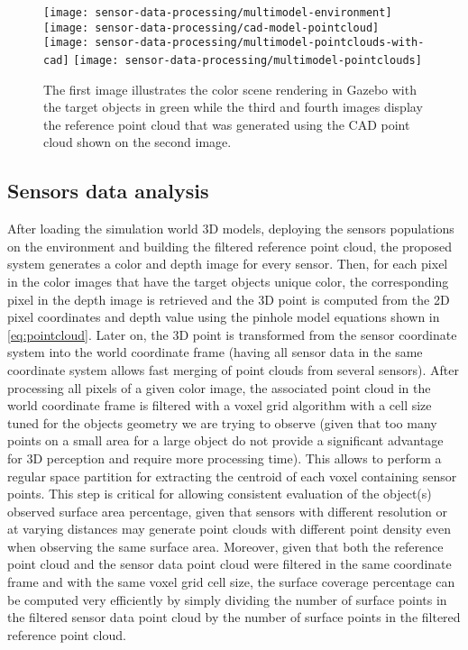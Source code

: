 \begin{figure}
	\centering
	\texttt{[image: sensor-data-processing/multimodel-environment]}\hspace{2em}
	\texttt{[image: sensor-data-processing/cad-model-pointcloud]}
	\texttt{[image: sensor-data-processing/multimodel-pointclouds-with-cad]}\hspace{2em}
	\texttt{[image: sensor-data-processing/multimodel-pointclouds]}
	\caption{The first image illustrates the color scene rendering in Gazebo with the target objects in green while the third and fourth images display the reference point cloud that was generated using the CAD point cloud shown on the second image.}
	\label{fig:reference-cloud}
\end{figure}


\subsection{Sensors data analysis}

After loading the simulation world 3D models, deploying the sensors populations on the environment and building the filtered reference point cloud, the proposed system generates a color and depth image for every sensor. Then, for each pixel in the color images that have the target objects unique color, the corresponding pixel in the depth image is retrieved and the 3D point is computed from the 2D pixel coordinates and depth value using the pinhole model equations shown in \cref{eq:pointcloud}. Later on, the 3D point is transformed from the sensor coordinate system into the world coordinate frame (having all sensor data in the same coordinate system allows fast merging of point clouds from several sensors). After processing all pixels of a given color image, the associated point cloud in the world coordinate frame is filtered with a voxel grid algorithm with a cell size tuned for the objects geometry we are trying to observe (given that too many points on a small area for a large object do not provide a significant advantage for 3D perception and require more processing time). This allows to perform a regular space partition for extracting the centroid of each voxel containing sensor points. This step is critical for allowing consistent evaluation of the object(s) observed surface area percentage, given that sensors with different resolution or at varying distances may generate point clouds with different point density even when observing the same surface area. Moreover, given that both the reference point cloud and the sensor data point cloud were filtered in the same coordinate frame and with the same voxel grid cell size, the surface coverage percentage can be computed very efficiently by simply dividing the number of surface points in the filtered sensor data point cloud by the number of surface points in the filtered reference point cloud.

